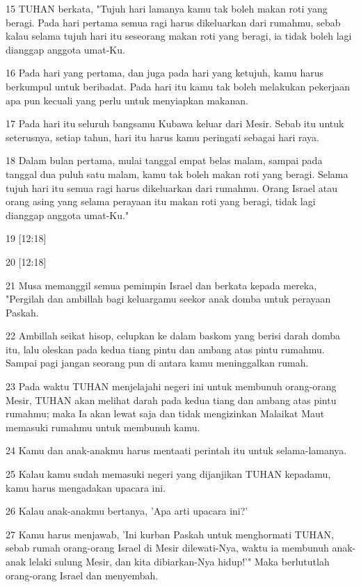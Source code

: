 \par 15 TUHAN berkata, "Tujuh hari lamanya kamu tak boleh makan roti yang beragi. Pada hari pertama semua ragi harus dikeluarkan dari rumahmu, sebab kalau selama tujuh hari itu seseorang makan roti yang beragi, ia tidak boleh lagi dianggap anggota umat-Ku.
\par 16 Pada hari yang pertama, dan juga pada hari yang ketujuh, kamu harus berkumpul untuk beribadat. Pada hari itu kamu tak boleh melakukan pekerjaan apa pun kecuali yang perlu untuk menyiapkan makanan.
\par 17 Pada hari itu seluruh bangsamu Kubawa keluar dari Mesir. Sebab itu untuk seterusnya, setiap tahun, hari itu harus kamu peringati sebagai hari raya.
\par 18 Dalam bulan pertama, mulai tanggal empat belas malam, sampai pada tanggal dua puluh satu malam, kamu tak boleh makan roti yang beragi. Selama tujuh hari itu semua ragi harus dikeluarkan dari rumahmu. Orang Israel atau orang asing yang selama perayaan itu makan roti yang beragi, tidak lagi dianggap anggota umat-Ku."
\par 19 [12:18]
\par 20 [12:18]
\par 21 Musa memanggil semua pemimpin Israel dan berkata kepada mereka, "Pergilah dan ambillah bagi keluargamu seekor anak domba untuk perayaan Paskah.
\par 22 Ambillah seikat hisop, celupkan ke dalam baskom yang berisi darah domba itu, lalu oleskan pada kedua tiang pintu dan ambang atas pintu rumahmu. Sampai pagi jangan seorang pun di antara kamu meninggalkan rumah.
\par 23 Pada waktu TUHAN menjelajahi negeri ini untuk membunuh orang-orang Mesir, TUHAN akan melihat darah pada kedua tiang dan ambang atas pintu rumahmu; maka Ia akan lewat saja dan tidak mengizinkan Malaikat Maut memasuki rumahmu untuk membunuh kamu.
\par 24 Kamu dan anak-anakmu harus mentaati perintah itu untuk selama-lamanya.
\par 25 Kalau kamu sudah memasuki negeri yang dijanjikan TUHAN kepadamu, kamu harus mengadakan upacara ini.
\par 26 Kalau anak-anakmu bertanya, 'Apa arti upacara ini?'
\par 27 Kamu harus menjawab, 'Ini kurban Paskah untuk menghormati TUHAN, sebab rumah orang-orang Israel di Mesir dilewati-Nya, waktu ia membunuh anak-anak lelaki sulung Mesir, dan kita dibiarkan-Nya hidup!'" Maka berlututlah orang-orang Israel dan menyembah.
